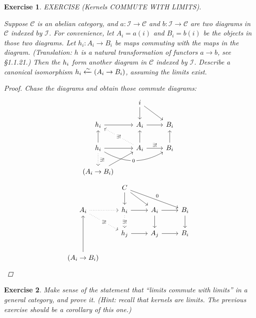 \documentclass{article}
\theoremstyle{breakstyle}
\newtheorem{exercise}{Exercise}[section]
\let\ker\relax
\DeclareMathOperator{\ker}{Ker}
\let\lim\relax
\DeclareMathOperator{\lim}{Lim}
\begin{document}
\begin{exercise}
EXERCISE (Kernels COMMUTE WITH LIMITS).

Suppose $\mathcal{C}$ is an abelian category, and $a\colon \mathcal{I} \to
\mathcal{C}$ and $b\colon \mathcal{I} \to \mathcal{C}$ are two diagrams in
$\mathcal{C}$ indexed by $\mathcal{I}$. For convenience, let $A_i = a(i)$
and $B_i = b(i)$ be the objects in those two diagrams. Let $h_i\colon A_i
\to B_i$ be maps commuting with the maps in the diagram. (Translation: $h$
is a natural transformation of functors $a \to b$, see \S\emph{1.1.21}.)
Then the $\ker h_i$ form another diagram in $\mathcal{C}$ indexed by
$\mathcal{I}$. Describe a canonical isomorphism $\lim \ker h_i
\xleftarrow{\sim} \ker(\lim A_i \to \lim B_i)$, assuming the limits exist.

\begin{proof}
    Chase the diagrams and obtain those commute diagrams:
    $$
    \begin{tikzcd}
                                                                                                              & i \arrow[d] \arrow[rd]                                                               &                     \\
    \ker{h_i} \arrow[r]                                                                                       & A_i \arrow[r]                                                                        & B_i                 \\
    \lim{\ker{h_i}} \arrow[u] \arrow[r] \arrow[d, "\exists!", dotted] \arrow[rr, "0" description, bend right] & \lim{A_i} \arrow[r, "\exists!"] \arrow[u] \arrow[lu, "\exists!" description, dotted] & \lim{B_i} \arrow[u] \\
    \ker{(\lim{A_i}\rightarrow\lim{B_i})} \arrow[ru]                                                            &                                                                                      &                    
    \end{tikzcd}
    $$
    $$
    \begin{tikzcd}
                                                                           & C \arrow[d] \arrow[rd] \arrow[rrd, "0"]                       &                         &               \\
    \lim{A_i} \arrow[r, dotted] \arrow[rd, "\exists!" description, dotted] & \ker{h_i} \arrow[r] \arrow[d, "\exists!" description, dotted] & A_i \arrow[r] \arrow[d] & B_i \arrow[d] \\
                                                                           & \ker{h_j} \arrow[r]                                           & A_j \arrow[r]           & B_i           \\
    \ker{(\lim{A_i}\rightarrow\lim{B_i})} \arrow[uu]                       &                                                               &                         &              
    \end{tikzcd}
    $$
\end{proof}

\end{exercise}

\begin{exercise}
Make sense of the statement that ``limits commute with limits'' in a
general category, and prove it. (Hint: recall that kernels are limits. The
previous exercise should be a corollary of this one.)
\end{exercise}
\end{document}
